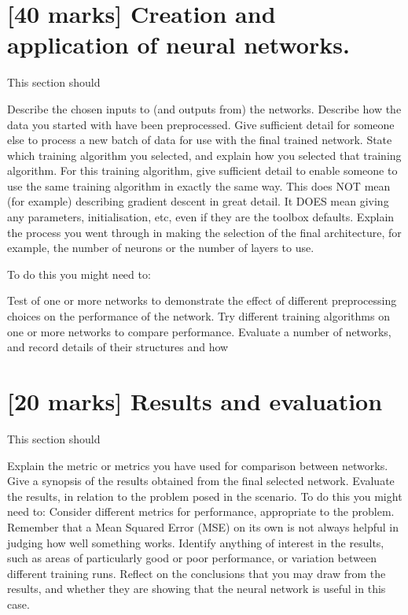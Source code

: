 \documentclass[11pt,a4paper]{article}
\begin{document}
\section{[40 marks] Creation and application of neural networks.}
This section should
\begin{outline}
    

  \1 Describe the chosen inputs to (and outputs from) the networks.
  \1 Describe how the data you started with have been preprocessed.
  \1 Give sufficient detail for someone else to process a new batch of data for use with the final trained network.
  \1 State which training algorithm you selected, and explain how you selected that training algorithm. For this training algorithm, give sufficient detail to enable someone to use the same training algorithm in exactly the same way. This does NOT mean (for example) describing gradient descent in great detail. It DOES mean giving any parameters, initialisation, etc, even if they are the toolbox defaults.
  \1 Explain the process you went through in making the selection of the final architecture, for example, the number of neurons or the number of layers to use.
\end{outline}


To do this you might need to:
\begin{outline}
  \1 Test of one or more networks to demonstrate the effect of different
preprocessing choices on the performance of the network.
  \1 Try different training algorithms on one or more networks to compare
performance.
  \1 Evaluate a number of networks, and record details of their structures and how
\end{outline}

\section{[20 marks] Results and evaluation}
This section should
\begin{outline}
  \1 Explain the metric or metrics you have used for comparison between networks.
  \1 Give a synopsis of the results obtained from the final selected network.
  \1 Evaluate the results, in relation to the problem posed in the scenario.
To do this you might need to:
  \1 Consider different metrics for performance, appropriate to the problem.
Remember that a Mean Squared Error (MSE) on its own is not always helpful in
judging how well something works.
  \1 Identify anything of interest in the results, such as areas of particularly good or poor performance, or variation between different training runs.
  \1 Reflect on the conclusions that you may draw from the results, and whether
they are showing that the neural network is useful in this case.
\end{outline}
\end{document}
